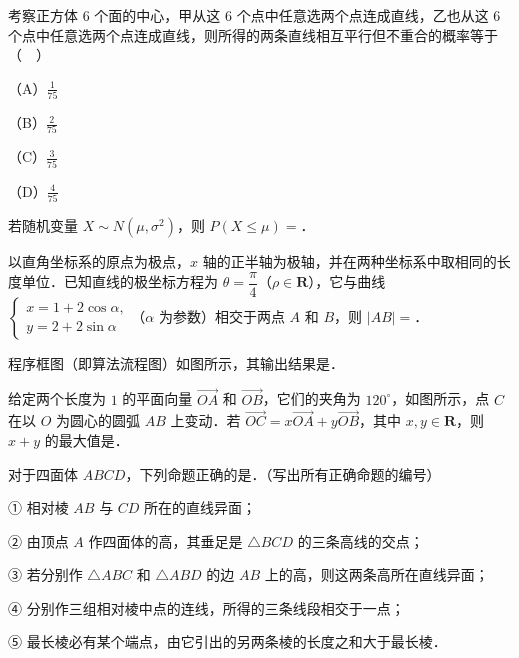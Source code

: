 \begin{question}
考察正方体 $6$ 个面的中心，甲从这 $6$ 个点中任意选两个点连成直线，乙也从这 $6$ 个点中任意选两个点连成直线，则所得的两条直线相互平行但不重合的概率等于（　）

（A）$\frac1{75}$

（B）$\frac2{75}$

（C）$\frac3{75}$

（D）$\frac4{75}$

\end{question}

\begin{question}
若随机变量 $X\sim N(\mu,\sigma^2)$，则 $P(X\leqslant\mu)=$\gkblank{}．

\end{question}
\begin{question}
以直角坐标系的原点为极点，$x$ 轴的正半轴为极轴，并在两种坐标系中取相同的长度单位．已知直线的极坐标方程为 $\theta=\dfrac{\pi}{4}$（$\rho\in\mathbf R$），它与曲线 $\begin{cases}x=1+2\cos\alpha,\\ y=2+2\sin\alpha\end{cases}$（$\alpha$ 为参数）相交于两点 $A$ 和 $B$，则 $|AB|=$\gkblank{}．

\Needspace{0.4\textheight}
\end{question}
\begin{question}
程序框图（即算法流程图）如图所示，其输出结果是\gkblank{}．
\nopagebreak[4]
\begin{center}\end{center}
\nopagebreak[4]
\Needspace{0.4\textheight}
\end{question}
\begin{question}
给定两个长度为 $1$ 的平面向量 $\overrightarrow{OA}$ 和 $\overrightarrow{OB}$，它们的夹角为 $120^\circ$，如图所示，点 $C$ 在以 $O$ 为圆心的圆弧 $AB$ 上变动．若 $\overrightarrow{OC}=x\overrightarrow{OA}+y\overrightarrow{OB}$，其中 $x,y\in\mathbf R$，则 $x+y$ 的最大值是\gkblank{}．
\nopagebreak[4]
\begin{center}\end{center}
\nopagebreak[4]
\end{question}
\begin{question}
对于四面体 $ABCD$，下列命题正确的是\gkblank{}．（写出所有正确命题的编号）

① 相对棱 $AB$ 与 $CD$ 所在的直线异面；

② 由顶点 $A$ 作四面体的高，其垂足是 $\triangle BCD$ 的三条高线的交点；

③ 若分别作 $\triangle ABC$ 和 $\triangle ABD$ 的边 $AB$ 上的高，则这两条高所在直线异面；

④ 分别作三组相对棱中点的连线，所得的三条线段相交于一点；

⑤ 最长棱必有某个端点，由它引出的另两条棱的长度之和大于最长棱．

\end{question}

